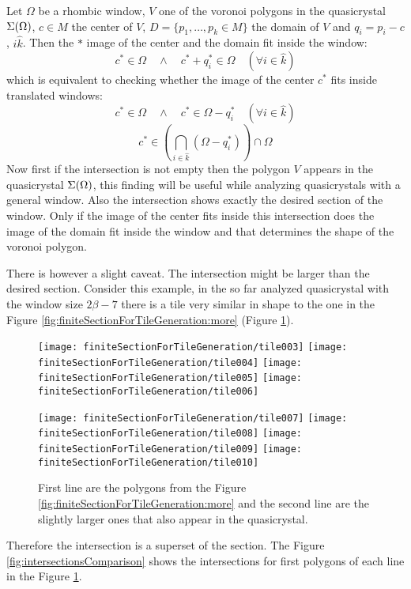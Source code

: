 \documentclass[text.tex]{subfiles}
\begin{document}
Let $\Omega$ be a rhombic window, $V$ one of the voronoi polygons in the quasicrystal $\Sigma(\Omega)$, $c\in M$ the center of $V$, $D = \{p_1,\dots,p_k\in M\}$ the domain of $V$ and $q_i = p_i - c$, $i\hat{k}$.
Then the $\ast$ image of the center and the domain fit inside the window:
$$c^\ast\in\Omega \quad\wedge\quad c^\ast + q_i^\ast\in\Omega \quad(\forall i\in\hat{k})$$
which is equivalent to checking whether the image of the center $c^\ast$ fits inside translated windows:
$$c^\ast\in\Omega \quad\wedge\quad c^\ast\in\Omega-q_i^\ast \quad(\forall i\in\hat{k})$$
$$c^\ast\in\left(\bigcap\limits_{i\in\hat{k}}(\Omega-q_i^\ast)\right)\cap\Omega$$
Now first if the intersection is not empty then the polygon $V$ appears in the quasicrystal $\Sigma(\Omega)$, this finding will be useful while analyzing quasicrystals with a general window. Also the intersection shows exactly the desired section of the window. Only if the image of the center fits inside this intersection does the image of the domain fit inside the window and that determines the shape of the voronoi polygon. 

There is however a slight caveat. The intersection might be larger than the desired section. Consider this example, in the so far analyzed quasicrystal with the window size $2\beta-7$ there is a tile very similar in shape to the one in the Figure \ref{fig:finiteSectionForTileGeneration:more} (Figure \ref{fig:finiteSectionForTileGeneration:bigger}).
\begin{figure}[h]
\centering
\texttt{[image: finiteSectionForTileGeneration/tile003]}
\texttt{[image: finiteSectionForTileGeneration/tile004]}
\texttt{[image: finiteSectionForTileGeneration/tile005]}
\texttt{[image: finiteSectionForTileGeneration/tile006]}

\texttt{[image: finiteSectionForTileGeneration/tile007]}
\texttt{[image: finiteSectionForTileGeneration/tile008]}
\texttt{[image: finiteSectionForTileGeneration/tile009]}
\texttt{[image: finiteSectionForTileGeneration/tile010]}
\caption{First line are the polygons from the Figure \ref{fig:finiteSectionForTileGeneration:more} and the second line are the slightly larger ones that also appear in the quasicrystal.}
\label{fig:finiteSectionForTileGeneration:bigger}
\end{figure}

Therefore the intersection is a superset of the section. The Figure \ref{fig:intersectionsComparison} shows the intersections for first polygons of each line in the Figure \ref{fig:finiteSectionForTileGeneration:bigger}.
\end{document}
